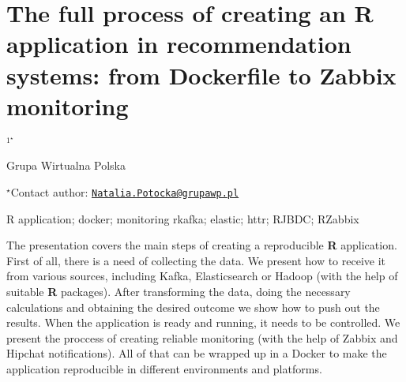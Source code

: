 \documentclass[\main/boa.tex]{subfiles}
\begin{document}
\section{The full process of creating an R application in recommendation systems:
from Dockerfile to Zabbix monitoring}

\begin{center}
  {\bf {}$^{1^\star}$}
\end{center}

\vskip 0.3cm

\begin{affiliations}
\begin{enumerate}
\begin{minipage}{0.915\textwidth}
\centering
\item Grupa Wirtualna Polska \\[-2pt]
\end{minipage}
\end{enumerate}
$^\star$Contact author: \href{mailto:Natalia.Potocka@grupawp.pl}{\nolinkurl{Natalia.Potocka@grupawp.pl}}\\
\end{affiliations}

\vskip 0.5cm

\begin{minipage}{0.915\textwidth}
\keywords R application; docker; monitoring
\packages rkafka; elastic; httr; RJBDC; RZabbix
\end{minipage}

\vskip 0.8cm

The presentation covers the main steps of creating a reproducible
\textbf{R} application. First of all, there is a need of collecting the
data. We present how to receive it from various sources, including
Kafka, Elasticsearch or Hadoop (with the help of suitable \textbf{R}
packages). After transforming the data, doing the necessary calculations
and obtaining the desired outcome we show how to push out the results.
When the application is ready and running, it needs to be controlled. We
present the proccess of creating reliable monitoring (with the help of
Zabbix and Hipchat notifications). All of that can be wrapped up in a
Docker to make the application reproducible in different environments
and platforms.
\end{document}
